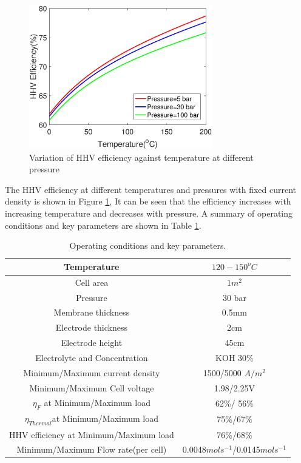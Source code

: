 \begin{figure}[H]
\centering
\includegraphics[width=8cm]{HHV.eps}
\caption{Variation of HHV efficiency against temperature at different pressure}
\label{fig:HHV}
\end{figure} 
The HHV efficiency at different temperatures and pressures with fixed current density is shown in Figure \ref{fig:HHV}, It can be seen that the efficiency increases with increasing temperature and decreases with pressure. A summary of operating conditions and key parameters are shown in Table \ref{tab:oo}.

\begin{table}
\centering
\begin{tabular}{ |c|c| } 
 \hline
 Temperature & $120 - 150 ^oC$  \\ 
 \hline
 Cell area & $1m^2$\\
 \hline
 Pressure & 30 bar \\
 \hline
 Membrane thickness & 0.5mm\\ 
 \hline
 Electrode thickness & 2cm\\
 \hline
 Electrode height & 45cm\\
 \hline
 Electrolyte and Concentration & KOH $30\%$\\
 \hline
 Minimum/Maximum current density & 1500/5000 $A/m^2$\\
 \hline
 Minimum/Maximum Cell voltage & 1.98/2.25V \\ 
 \hline
 $\eta_F$ at Minimum/Maximum load & 62\%/ 56\% \\ 

 \hline
 $\eta_{Thermal}$at Minimum/Maximum load & 75\%/67\% \\ 
 \hline
 HHV efficiency at Minimum/Maximum load &  76\%/68\% \\ 
 \hline
 Minimum/Maximum Flow rate(per cell) & 0.0048$mols^{-1}$/0.0145$mols^{-1}$\\
 \hline
\end{tabular}
\caption{\label{tab:oo}Operating conditions and key parameters.}
\end{table}




